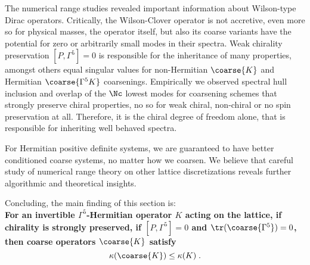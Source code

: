 

The numerical range studies revealed important information about Wilson-type Dirac operators.
Critically, the Wilson-Clover operator is not accretive, even more so for physical masses, \ie the operator itself, but also its coarse variants have the potential for zero or arbitrarily small modes in their spectra.
Weak chirality preservation $[P, \Gamma^{5}]=0$ is responsible for the inheritance of many properties, amongst others equal singular values for non-Hermitian $\coarse{K}$ and Hermitian $\coarse{\Gamma^{5} K}$ coarsenings.
Empirically we observed spectral hull inclusion and overlap of the $\Nc$ lowest modes for coarsening schemes that strongly preserve chiral properties, no so for weak chiral, non-chiral or no spin preservation at all.
Therefore, it is the chiral degree of freedom alone, that is responsible for inheriting well behaved spectra.


For Hermitian positive definite systems, we are guaranteed to have better conditioned coarse systems, no matter how we coarsen.
We believe that careful study of numerical range theory on other lattice discretizations reveals further algorithmic and theoretical insights.

Concluding, the main finding of this section is:\\
\textbf{
For an invertible $\Gamma^{5}$-Hermitian operator $K$ acting on the lattice,
if chirality is strongly preserved, \ie if $[P, \Gamma^{5}] = 0$ and $\tr(\coarse{\Gamma^5}) = 0$, then coarse operators $\coarse{K}$ satisfy
\begin{equation}
\kappa(\coarse{K}) \leq \kappa(K) \;.
\end{equation}
}
